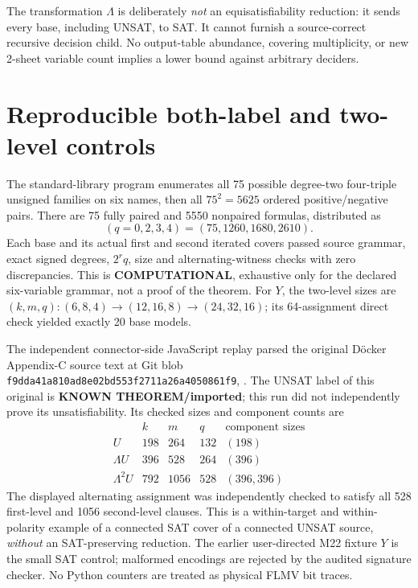 \documentclass[11pt]{article}
\begin{document}
The transformation \(\Lambda\) is deliberately \emph{not} an
equisatisfiability reduction: it sends every base, including UNSAT, to
SAT. It cannot furnish a source-correct recursive decision child.
No output-table abundance, covering multiplicity, or new 2-sheet
variable count implies a lower bound against arbitrary deciders.

\section{Reproducible both-label and two-level controls}
The standard-library program
enumerates all 75 possible degree-two four-triple unsigned families on six
names, then all \(75^2=5625\) ordered positive/negative pairs.
There are 75 fully paired and 5550 nonpaired formulas, distributed as
\[
(q=0,2,3,4)=(75,1260,1680,2610).
\]
Each base and its actual first and second iterated covers passed source
grammar, exact signed degrees, \(2^r q\), size and alternating-witness
checks with zero discrepancies. This is \textbf{COMPUTATIONAL}, exhaustive
only for the declared six-variable grammar, not a proof of the theorem.
For \(Y\), the two-level sizes are \((k,m,q):
(6,8,4)\to(12,16,8)\to(24,32,16)\);
its 64-assignment direct check yielded exactly 20 base models.

The independent connector-side JavaScript replay parsed the original
D\"ocker Appendix-C source text at Git blob
\texttt{f9dda41a810ad8e02bd553f2711a26a4050861f9},
.
The UNSAT label of this original is \textbf{KNOWN THEOREM/imported};
this run did not independently prove its unsatisfiability.
Its checked sizes and component counts are
\[
\begin{array}{c|ccc|c}
&k&m&q&\text{component sizes}\\ \hline
U&198&264&132&(198)\\
\Lambda U&396&528&264&(396)\\
\Lambda^2U&792&1056&528&(396,396)
\end{array}
\]
The displayed alternating assignment was independently checked to
satisfy all 528 first-level and 1056 second-level clauses.
This is a within-target and within-polarity example of a connected
SAT cover of a connected UNSAT source, \emph{without} an SAT-preserving
reduction. The earlier user-directed M22 fixture \(Y\) is the small
SAT control; malformed encodings are rejected by the audited signature
checker. No Python counters are treated as physical FLMV bit traces.
\end{document}
